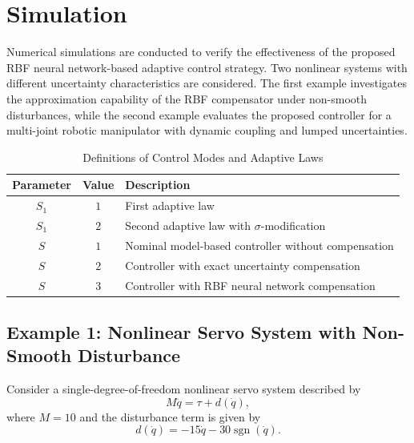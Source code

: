 \section{Simulation}
\label{sec:simulations}

Numerical simulations are conducted to verify the effectiveness of the proposed RBF neural network-based adaptive control strategy. 
Two nonlinear systems with different uncertainty characteristics are considered. 
The first example investigates the approximation capability of the RBF compensator under non-smooth disturbances, while the second example evaluates the proposed controller for a multi-joint robotic manipulator with dynamic coupling and lumped uncertainties.

\begin{table}[!t]
	\caption{Definitions of Control Modes and Adaptive Laws}
	\label{tab:control_modes}
	\centering
	\begin{tabular}{c c l}
		\hline
		Parameter & Value & Description \\
		\hline
		$S_1$ & $1$ & First adaptive law \\
		$S_1$ & $2$ & Second adaptive law with $\sigma$-modification \\
		\hline
		$S$ & $1$ & Nominal model-based controller without compensation \\
		$S$ & $2$ & Controller with exact uncertainty compensation \\
		$S$ & $3$ & Controller with RBF neural network compensation \\
		\hline
	\end{tabular}
\end{table}

\subsection{Example 1: Nonlinear Servo System with Non-Smooth Disturbance}

Consider a single-degree-of-freedom nonlinear servo system described by
\begin{equation}
	M\ddot{q}=\tau+d(\dot{q}),
\end{equation}
where $M=10$ and the disturbance term is given by
\begin{equation}
	d(\dot{q})=-15\dot{q}-30\operatorname{sgn}(\dot{q}).
\end{equation}

